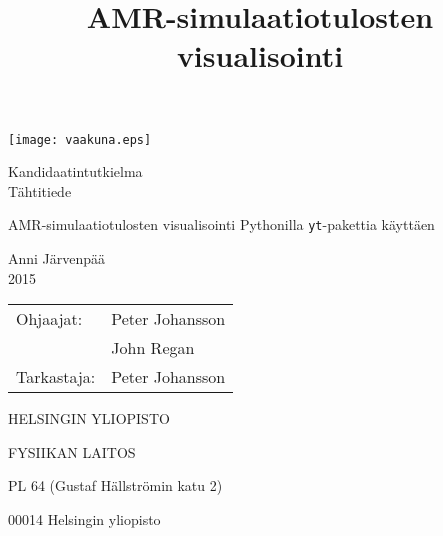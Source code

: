 \documentclass[11pt,a4paper,twoside]{report}
\begin{document}
\begin{titlepage}
\setcounter{page}{1}

\begin{center}

\vspace*{4cm}
\texttt{[image: vaakuna.eps]}

\vspace*{2cm}

Kandidaatintutkielma \\
Tähtitiede

\vspace{2.0cm} 
{\Large \bf
  \rule{0pt}{3ex}AMR-simulaatiotulosten visualisointi Pythonilla \texttt{yt}-pakettia käyttäen
}

\title{
AMR-simulaatiotulosten visualisointi
}

\vspace{2.0cm} 
Anni Järvenpää \\
2015

\vspace{1.5cm} 
\begin{tabular}{ll}	Ohjaajat: & 	Peter Johansson \\
							& John Regan \\
			Tarkastaja: & Peter Johansson 
\end{tabular}

\vspace{1.5cm} HELSINGIN YLIOPISTO

FYSIIKAN LAITOS

\vspace{0.5cm} PL 64 (Gustaf Hällströmin katu 2)

00014 Helsingin yliopisto

\end{center}

\end{titlepage}
\end{document}
